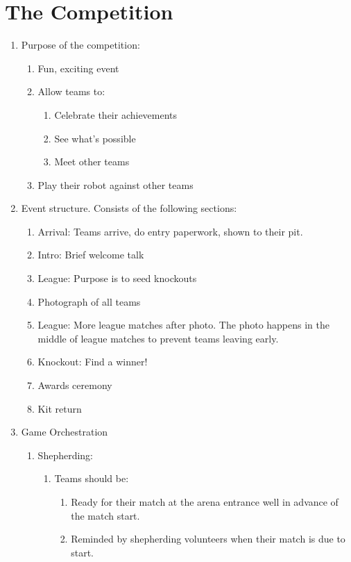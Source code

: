 \section{The Competition}

\begin{enumerate}
\item Purpose of the competition:
  \begin{enumerate}
  \item Fun, exciting event
  \item Allow teams to:
    \begin{enumerate}
    \item Celebrate their achievements
    \item See what's possible
    \item Meet other teams
    \end{enumerate}
  \item Play their robot against other teams
  \end{enumerate}

\item Event structure.  Consists of the following sections:
  \begin{enumerate}
  \item Arrival: Teams arrive, do entry paperwork, shown to their pit.
  \item Intro: Brief welcome talk
  \item League: Purpose is to seed knockouts
  \item Photograph of all teams
  \item League: More league matches after photo. The photo happens in the middle of league matches to prevent teams leaving early.
  \item Knockout: Find a winner!
  \item Awards ceremony
  \item Kit return
  \end{enumerate}

\item Game Orchestration
  \begin{enumerate}
  \item Shepherding:
    \begin{enumerate}
    \item Teams should be:
      \begin{enumerate}
      \item Ready for their match at the arena entrance well in advance of the match start.
      \item Reminded by shepherding volunteers when their match is due to start.
      \end{enumerate}


\end{enumerate}
\end{enumerate}
\end{enumerate}
